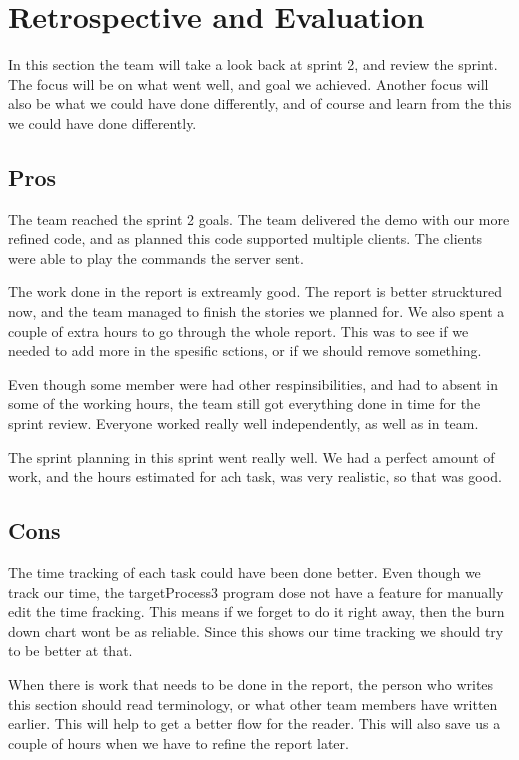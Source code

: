 \section{Retrospective and Evaluation}
In this section the team will take a look back at sprint 2, and review the sprint. The focus will be on what went well, and goal we achieved. Another focus will also be what we could have done differently, and of course and learn from the this we could have done differently.

\subsection{Pros}
The team reached the sprint 2 goals. The team delivered the demo with our more refined code, and as planned this code supported multiple clients. The clients were able to play the commands the server sent.

The work done in the report is extreamly good. The report is better strucktured now, and the team managed to finish the stories we planned for. We also spent a couple of extra hours to go through the whole report. This was to see if we needed to add more in the spesific sctions, or if we should remove something.  

Even though some member were had other respinsibilities, and had to absent in some of the working hours, the team still got everything done in time for the sprint review. Everyone worked really well independently, as well as in team. 

The sprint planning in this sprint went really well. We had a perfect amount of work, and the hours estimated for ach task, was very realistic, so that was good. 


\subsection{Cons}
The time tracking of each task could have been done better. 
Even though we track our time, the targetProcess3 program dose not have a feature for manually edit the time fracking. 
This means if we forget to do it right away, then the burn down chart wont be as reliable. Since this shows our time tracking we should try to be better at that.

When there is work that needs to be done in the report, the person who writes this section should read terminology, or what other team members have written earlier. This will help to get a better flow for the reader.
This will also save us a couple of hours when we have to refine the report later. 